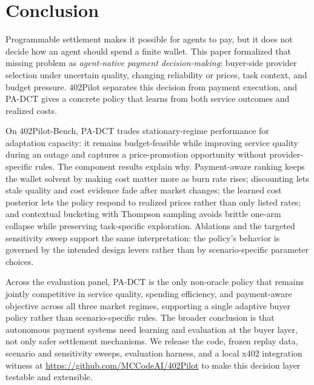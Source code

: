 \section{Conclusion}
\label{sec:conclusion}

Programmable settlement makes it possible for agents to pay, but it does not decide how an agent should spend a finite wallet. This paper formalized that missing problem as \emph{agent-native payment decision-making}: buyer-side provider selection under uncertain quality, changing reliability or prices, task context, and budget pressure. 402Pilot separates this decision from payment execution, and PA-DCT gives a concrete policy that learns from both service outcomes and realized costs.

On 402Pilot-Bench, PA-DCT trades stationary-regime performance for adaptation capacity: it remains budget-feasible while improving service quality during an outage and captures a price-promotion opportunity without provider-specific rules. The component results explain why. Payment-aware ranking keeps the wallet solvent by making cost matter more as burn rate rises; discounting lets stale quality and cost evidence fade after market changes; the learned cost posterior lets the policy respond to realized prices rather than only listed rates; and contextual bucketing with Thompson sampling avoids brittle one-arm collapse while preserving task-specific exploration. Ablations and the targeted sensitivity sweep support the same interpretation: the policy's behavior is governed by the intended design levers rather than by scenario-specific parameter choices.

Across the evaluation panel, PA-DCT is the only non-oracle policy that remains jointly competitive in service quality, spending efficiency, and payment-aware objective across all three market regimes, supporting a single adaptive buyer policy rather than scenario-specific rules. The broader conclusion is that autonomous payment systems need learning and evaluation at the buyer layer, not only safer settlement mechanisms. We release the code, frozen replay data, scenario and sensitivity sweeps, evaluation harness, and a local x402 integration witness at \url{https://github.com/MCCodeAI/402Pilot} to make this decision layer testable and extensible.
